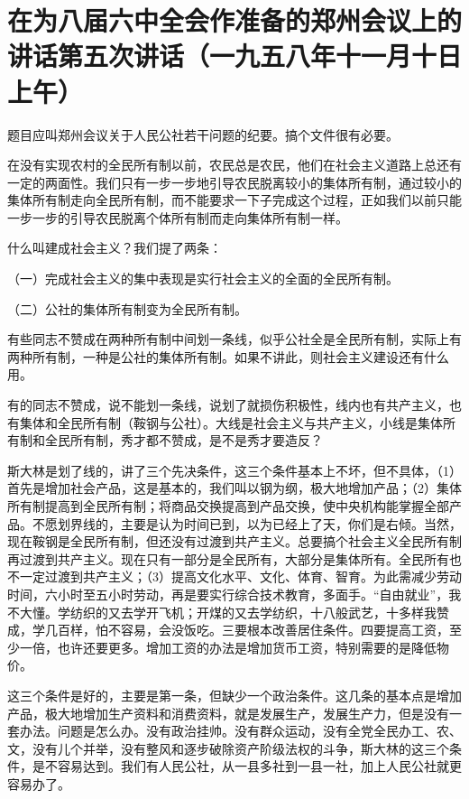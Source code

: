 \section[在为八届六中全会作准备的郑州会议上的讲话第五次讲话（一九五八年十一月十日上午）]{在为八届六中全会作准备的郑州会议上的讲话第五次讲话（一九五八年十一月十日上午）}


题目应叫郑州会议关于人民公社若干问题的纪要。搞个文件很有必要。

在没有实现农村的全民所有制以前，农民总是农民，他们在社会主义道路上总还有一定的两面性。我们只有一步一步地引导农民脱离较小的集体所有制，通过较小的集体所有制走向全民所有制，而不能要求一下子完成这个过程，正如我们以前只能一步一步的引导农民脱离个体所有制而走向集体所有制一样。

什么叫建成社会主义？我们提了两条：

（一）完成社会主义的集中表现是实行社会主义的全面的全民所有制。

（二）公社的集体所有制变为全民所有制。

有些同志不赞成在两种所有制中间划一条线，似乎公社全是全民所有制，实际上有两种所有制，一种是公社的集体所有制。如果不讲此，则社会主义建设还有什么用。

有的同志不赞成，说不能划一条线，说划了就损伤积极性，线内也有共产主义，也有集体和全民所有制（鞍钢与公社）。大线是社会主义与共产主义，小线是集体所有制和全民所有制，秀才都不赞成，是不是秀才要造反？

斯大林是划了线的，讲了三个先决条件，这三个条件基本上不坏，但不具体，（1）首先是增加社会产品，这是基本的，我们叫以钢为纲，极大地增加产品；（2）集体所有制提高到全民所有制；将商品交换提高到产品交换，使中央机构能掌握全部产品。不愿划界线的，主要是认为时间已到，以为已经上了天，你们是右倾。当然，现在鞍钢是全民所有制，但还没有过渡到共产主义。总要搞个社会主义全民所有制再过渡到共产主义。现在只有一部分是全民所有，大部分是集体所有。全民所有也不一定过渡到共产主义；（3）提高文化水平、文化、体育、智育。为此需减少劳动时间，六小时至五小时劳动，再是要实行综合技术教育，多面手。“自由就业”，我不大懂。学纺织的又去学开飞机；开煤的又去学纺织，十八般武艺，十多样我赞成，学几百样，怕不容易，会没饭吃。三要根本改善居住条件。四要提高工资，至少一倍，也许还要更多。增加工资的办法是增加货币工资，特别需要的是降低物价。

这三个条件是好的，主要是第一条，但缺少一个政治条件。这几条的基本点是增加产品，极大地增加生产资料和消费资料，就是发展生产，发展生产力，但是没有一套办法。问题是怎么办。没有政治挂帅。没有群众运动，没有全党全民办工、农、文，没有儿个并举，没有整风和逐步破除资产阶级法权的斗争，斯大林的这三个条件，是不容易达到。我们有人民公社，从一县多社到一县一社，加上人民公社就更容易办了。

